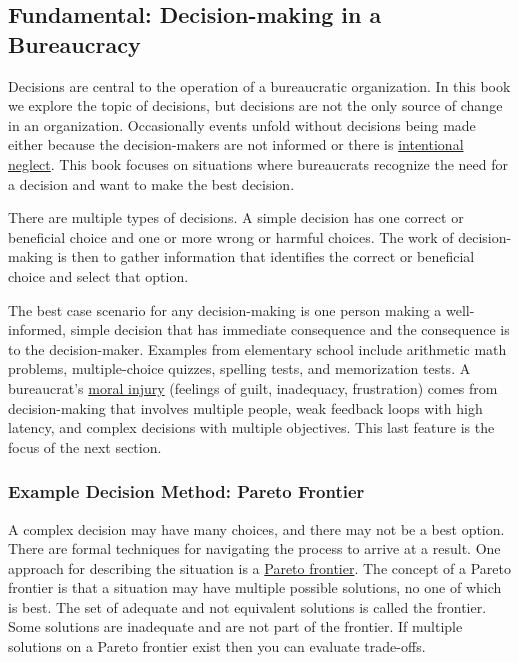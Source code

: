 \subsection*{Fundamental: Decision-making in a Bureaucracy\label{sec:decision-making}}

Decisions are central to the operation of a bureaucratic organization. In this book we explore the topic of decisions, but decisions are not the only source of change in an organization. Occasionally events unfold without decisions being made either because the decision-makers are not informed or there is  \href{https://en.wikipedia.org/wiki/Willful_blindness}{intentional neglect}. 
\iftoggle{WPinmargin}{\marginpar{$>$Wikipedia: Willful blindness}}{}
This book focuses on situations where bureaucrats recognize the need for a decision and want to make the best decision.

There are multiple types of decisions. 
A \gls{simple decision} \iftoggle{glossaryinmargin}{\marginpar{[Glossary]}}{}
has one correct or beneficial choice and one or more wrong or harmful choices. The work of decision-making is then to gather information that identifies the correct or beneficial choice and select that option.

The best case scenario for any decision-making is one person making a well-informed, simple decision that has immediate consequence and the consequence is to the decision-maker. Examples from elementary school include arithmetic math problems, multiple-choice quizzes, spelling tests, and memorization tests. A bureaucrat's \href{https://en.wikipedia.org/wiki/Moral_injury}{moral injury}
\iftoggle{WPinmargin}{\marginpar{$>$Wikipedia: moral injury}}{}
(feelings of guilt, inadequacy, frustration)
comes from decision-making that involves multiple people, weak feedback loops with high latency, and complex decisions with multiple objectives. This last feature is the focus of the next section.

\subsubsection*{Example Decision Method: Pareto Frontier\label{sec:pareto}}

A complex decision may have many choices, and there may not be a best option. There are formal techniques for navigating the process to arrive at a result. One approach for describing the situation is a \href{https://en.wikipedia.org/wiki/Pareto_front}{Pareto frontier}. The concept of a Pareto frontier is that a situation may have multiple possible solutions, no one of which is best. The set of adequate and not equivalent solutions is called the frontier. Some solutions are inadequate and are not part of the frontier. 
\iftoggle{WPinmargin}{\marginpar{$>$Wikipedia: Pareto frontier}}{}
If multiple solutions on a Pareto frontier exist then you can evaluate trade-offs. 

